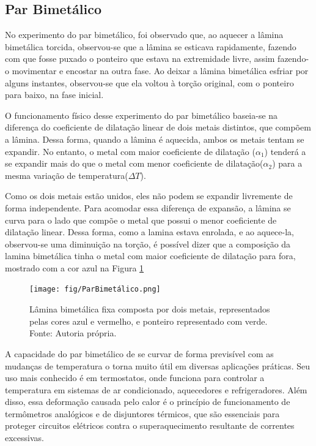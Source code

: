 \subsection{Par Bimetálico}
No experimento do par bimetálico, foi observado que, ao aquecer a lâmina bimetálica torcida, observou-se que a lâmina se esticava rapidamente, fazendo com que fosse puxado o ponteiro que estava na extremidade livre, assim fazendo-o movimentar e encostar na outra fase. Ao deixar a lâmina bimetálica esfriar por alguns instantes, observou-se que ela voltou à torção original, com o ponteiro para baixo, na fase inicial.

O funcionamento físico desse experimento do par bimetálico baseia-se na diferença do coeficiente de dilatação linear de dois metais distintos, que compõem a lâmina. Dessa forma, quando a lâmina é aquecida, ambos os metais tentam se expandir. No entanto, o metal com maior coeficiente de dilatação (\(\alpha_1\)) tenderá  a se expandir mais do que o metal com menor coeficiente de dilatação(\(\alpha_2\)) para a mesma variação de temperatura(\(\Delta T\)).

Como os dois metais estão unidos, eles não podem se expandir livremente de forma independente. Para acomodar essa diferença de expansão, a lâmina se curva para o lado que compõe o metal que possui o menor coeficiente de dilatação linear. Dessa forma, como a lamina estava enrolada, e ao aquece-la, observou-se uma diminuição na torção, é possível dizer que a composição da lamina bimetálica tinha o metal com maior coeficiente de dilatação para fora, mostrado com a cor azul na Figura \cref{ParBimetalico}

\begin{figure}[H]
	\centering
	\texttt{[image: fig/ParBimetálico.png]}
	\caption{Lâmina bimetálica fixa composta por dois metais, representados pelas cores azul e vermelho, e ponteiro representado com verde. Fonte: Autoria própria.}
	\label{ParBimetalico}
\end{figure}

A capacidade do par bimetálico de se curvar de forma previsível com as mudanças de temperatura o torna muito útil em diversas aplicações práticas. Seu uso mais conhecido é em termostatos, onde funciona para controlar a temperatura em sistemas de ar condicionado, aquecedores e refrigeradores. Além disso, essa deformação causada pelo calor é o princípio de funcionamento de termômetros analógicos e de disjuntores térmicos, que são essenciais para proteger circuitos elétricos contra o superaquecimento resultante de correntes excessivas.

